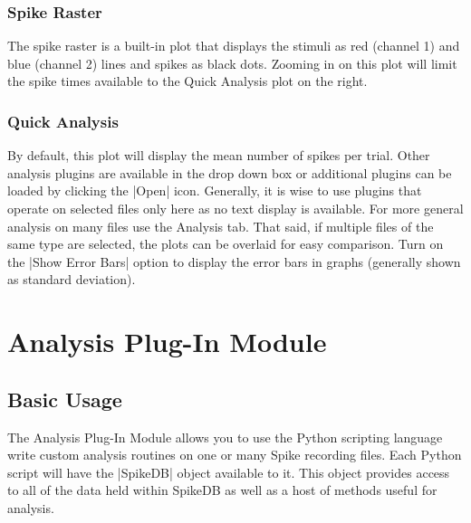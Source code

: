 \documentclass{report}
\begin{document}
\subsection{Spike Raster}
The spike raster is a built-in plot that displays the stimuli as red (channel 1) and blue (channel 2) lines and spikes as black dots. Zooming in on this plot will limit the spike times available to the Quick Analysis plot on the right.

\subsection{Quick Analysis}
By default, this plot will display the mean number of spikes per trial. Other analysis plugins are available in the drop down box or additional plugins can be loaded by clicking the |Open| icon. Generally, it is wise to use plugins that operate on selected files only here as no text display is available. For more general analysis on many files use the Analysis tab. That said, if multiple files of the same type are selected, the plots can be overlaid for easy comparison. Turn on the |Show Error Bars| option to display the error bars in graphs (generally shown as standard deviation).



\chapter{Analysis Plug-In Module}
\section{Basic Usage}
The Analysis Plug-In Module allows you to use the Python scripting language write custom analysis routines on one or many Spike recording files. Each Python script will have the |SpikeDB| object available to it.  This object provides access to all of the data held within SpikeDB as well as a host of methods useful for analysis.
\end{document}
